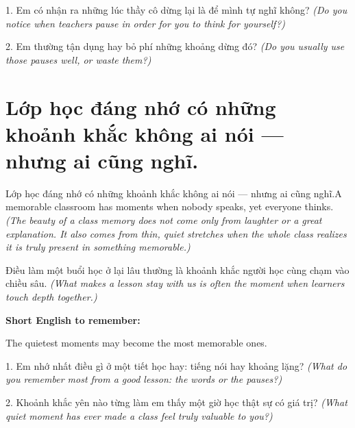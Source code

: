 \begin{tuhocnhanh}
1. Em có nhận ra những lúc thầy cô dừng lại là để mình tự nghĩ không? \textit{(Do you notice when teachers pause in order for you to think for yourself?)}

2. Em thường tận dụng hay bỏ phí những khoảng dừng đó? \textit{(Do you usually use those pauses well, or waste them?)}
\end{tuhocnhanh}
\ngancach


\section{Lớp học đáng nhớ có những khoảnh khắc không ai nói — nhưng ai cũng nghĩ.}
\begin{truyen}{Lớp học đáng nhớ có những khoảnh khắc không ai nói — nhưng ai cũng nghĩ.}{A memorable classroom has moments when nobody speaks, yet everyone thinks.}
\textit{(The beauty of a class memory does not come only from laughter or a great explanation. It also comes from thin, quiet stretches when the whole class realizes it is truly present in something memorable.)}
\end{truyen}

\begin{baihoc}
Điều làm một buổi học ở lại lâu thường là khoảnh khắc người học cùng chạm vào chiều sâu.
\textit{(What makes a lesson stay with us is often the moment when learners touch depth together.)}
\end{baihoc}

\begin{ghinhoanh}
\textbf{Short English to remember:}

The quietest moments may become the most memorable ones.

\end{ghinhoanh}

\begin{tuhocnhanh}
1. Em nhớ nhất điều gì ở một tiết học hay: tiếng nói hay khoảng lặng? \textit{(What do you remember most from a good lesson: the words or the pauses?)}

2. Khoảnh khắc yên nào từng làm em thấy một giờ học thật sự có giá trị? \textit{(What quiet moment has ever made a class feel truly valuable to you?)}
\end{tuhocnhanh}
\ngancach


